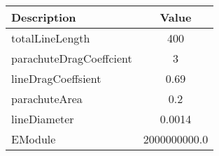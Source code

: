        \begin{center}

            \begin{tabular}{|l|c|}

               \hline

Description & Value  \\ \hline \hline 

totalLineLength & 400 \\ \hline 

parachuteDragCoeffcient & 3 \\ \hline 

lineDragCoeffsient & 0.69 \\ \hline 

parachuteArea & 0.2 \\ \hline 

lineDiameter & 0.0014 \\ \hline 

EModule & 2000000000.0 \\ \hline 

            \end{tabular}

        \end{center}

